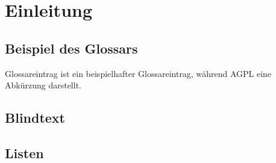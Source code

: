 
\chapter{Einleitung}
\label{cha:Einleitung}


\section{Beispiel des Glossars}
\label{sec:BspGlossar}

\gls{Glossareintrag} ist ein beispielhafter Glossareintrag, während \gls{AGPL} eine Abkürzung darstellt.

\blindtext[5] \autocite{Testautor2002}

\section{Blindtext}
\label{sec:Blindtext}

\blindtext[2] \autocite{Author2013}

\section{Listen}
\label{sec:Listen}

\blindtext

\blinditemize[5]

\blindtext[2]